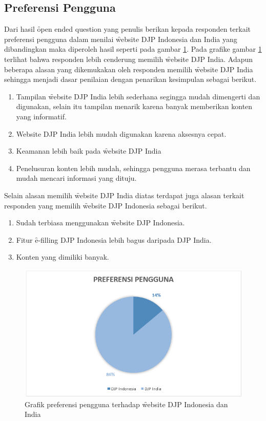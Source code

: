 \subsection{Preferensi Pengguna}
Dari hasil \f{open ended question} yang penulis berikan kepada responden terkait preferensi pengguna dalam menilai \f{website} DJP Indonesia dan India yang dibandingkan maka diperoleh hasil seperti pada gambar \ref{fig:preferensigraf}. Pada grafike gambar \ref{fig:preferensigraf} terlihat bahwa responden lebih cenderung memilih \f{website} DJP India.
Adapun beberapa alasan yang dikemukakan oleh responden memilih \f{website} DJP India sehingga menjadi dasar penilaian dengan penarikan kesimpulan sebagai berikut.
\begin{enumerate}
	\item Tampilan \f{website} DJP India lebih sederhana segingga mudah dimengerti dan digunakan, selain itu tampilan menarik karena banyak memberikan konten yang informatif.
	\item {Website} DJP India lebih mudah digunakan karena aksesnya cepat.
	\item Keamanan lebih baik pada \f{website} DJP India
	\item Penelusuran konten lebih mudah, sehingga pengguna merasa terbantu dan mudah mencari informasi yang dituju.
\end{enumerate}
Selain alasan memilih \f{website} DJP India diatas terdapat juga alasan terkait responden yang memilih \f{website} DJP Indonesia sebagai berikut.
\begin{enumerate}
	\item Sudah terbiasa menggunakan \f{website} DJP Indonesia.
	\item Fitur \f{e-filling} DJP Indonesia lebih bagus daripada DJP India.
	\item Konten yang dimiliki banyak.
\end{enumerate}

\begin{figure}
	\centering
	\includegraphics[width=\textwidth]
	{pics/preferensipengguna.PNG}
	\caption{Grafik preferensi pengguna terhadap \f{website} DJP Indonesia dan India}
	\label{fig:preferensigraf}
\end{figure}
\pagebreak
